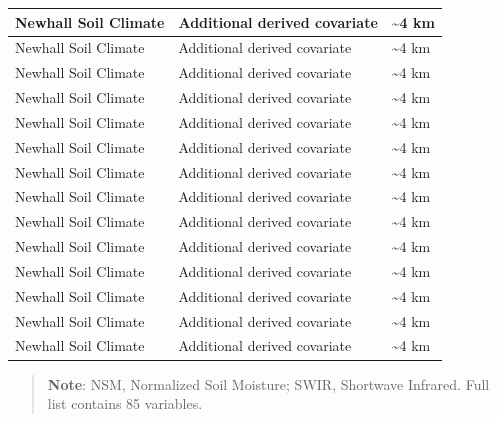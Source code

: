 \documentclass[
  10pt,
  b5paper,
  oneside]{book}
\begin{document}
\begin{table}
\begin{tabular}[t]{l|l|l}
\hline
Newhall Soil Climate & Additional derived covariate & \textasciitilde{}4 km\\
\hline
Newhall Soil Climate & Additional derived covariate & \textasciitilde{}4 km\\
\hline
Newhall Soil Climate & Additional derived covariate & \textasciitilde{}4 km\\
\hline
Newhall Soil Climate & Additional derived covariate & \textasciitilde{}4 km\\
\hline
Newhall Soil Climate & Additional derived covariate & \textasciitilde{}4 km\\
\hline
Newhall Soil Climate & Additional derived covariate & \textasciitilde{}4 km\\
\hline
Newhall Soil Climate & Additional derived covariate & \textasciitilde{}4 km\\
\hline
Newhall Soil Climate & Additional derived covariate & \textasciitilde{}4 km\\
\hline
Newhall Soil Climate & Additional derived covariate & \textasciitilde{}4 km\\
\hline
Newhall Soil Climate & Additional derived covariate & \textasciitilde{}4 km\\
\hline
Newhall Soil Climate & Additional derived covariate & \textasciitilde{}4 km\\
\hline
Newhall Soil Climate & Additional derived covariate & \textasciitilde{}4 km\\
\hline
Newhall Soil Climate & Additional derived covariate & \textasciitilde{}4 km\\
\hline
Newhall Soil Climate & Additional derived covariate & \textasciitilde{}4 km\\
\hline
\end{tabular}
\end{table}

\begin{quote}
\textbf{Note}: NSM, Normalized Soil Moisture; SWIR, Shortwave Infrared. Full list contains 85 variables.
\end{quote}
\end{document}
